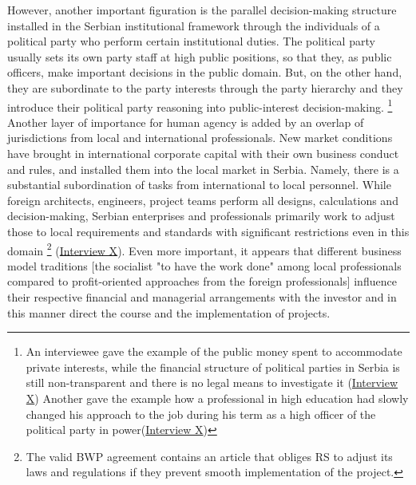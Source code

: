 \documentclass[11pt]{report}
\begin{document}
{{{{However, another important figuration is the parallel decision-making structure installed in the Serbian institutional framework through the individuals of a political party who perform certain institutional duties.  The political party usually sets its own party staff at high public positions, so that they, as public officers, make important decisions in the public domain. But, on the other hand, they are subordinate to the party interests through the party hierarchy and they introduce their political party reasoning into public-interest decision-making. 
\footnote
{An interviewee gave the example of the public money spent to accommodate private interests,
while the financial structure of political parties in Serbia is still non-transparent and there is no legal means to investigate it (\href{Annex}
{Interview X})
Another gave the example how a professional in high education had slowly changed his approach to the job during his term as a high officer of the political party in power(\href{Annex}
{Interview X})}
\\

Another layer of importance for human agency is added by an overlap of jurisdictions from local and international professionals.
New market conditions have brought in international corporate capital with their own business conduct and rules, and installed them into the local market in Serbia.  Namely, there is a substantial subordination of tasks from international to local personnel.
While foreign architects, engineers, project teams perform all designs, calculations and decision-making, Serbian enterprises and professionals primarily work to adjust those to local requirements and standards with significant restrictions even in this domain
\footnote{ The valid BWP agreement contains an article that obliges RS to adjust its laws and regulations if they prevent smooth implementation of the project.}
(\href{InterviewX}{Interview X}).
Even more important, it appears that different business model traditions [the socialist "to have the work done" among local professionals compared to profit-oriented approaches from the foreign professionals] influence their respective financial and managerial arrangements with the investor and in this manner direct the course and the implementation of projects.

}}}}
\end{document}

